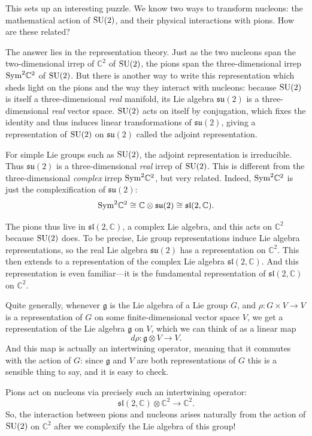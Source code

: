 \documentclass{article}
\newcommand{\maps}{\colon}    %
\newcommand{\C}{{\mathbb C}}  %
\newcommand{\SU}{{\rm SU}}    %
\renewcommand{\sl}{\mathfrak{sl}} %
\newcommand{\su}{{\mathfrak{su}}}  %
\newcommand{\Sym}{{\rm Sym}} %
\newcommand{\iso}{\cong} %
\begin{document}
This sets up an interesting puzzle.   We know two ways to transform 
nucleons: the mathematical action of $\SU(2)$, and their physical 
interactions with pions. How are these related?

The answer lies in the representation theory. Just as the two nucleons
span the two-dimensional irrep of $\C^2$ of $\SU(2)$, the pions 
span the three-dimensional irrep $\Sym^2 \C^2$ of $\SU(2)$. But there
is another way to write this representation which sheds light on the
pions and the way they interact with nucleons: because $\SU(2)$ is
itself a three-dimensional \emph{real} manifold, its Lie algebra
$\su(2)$ is a three-dimensional \emph{real}
vector space. $\SU(2)$ acts on itself by conjugation, which fixes the
identity and thus induces linear transformations of $\su(2)$, giving a
representation of $\SU(2)$ on $\su(2)$ called the adjoint
representation.

For simple Lie groups such as $\SU(2)$, the adjoint representation is
irreducible.  Thus $\su(2)$ is a three-dimensional \emph{real} irrep
of $\SU(2)$.  This is different from the three-dimensional \emph{complex} 
irrep $\Sym^2 \C^2$, but very related. Indeed, $\Sym^2 \C^2$ is just the
complexification of $\su(2)$:
\[ \Sym^2 \C^2 \iso \C \otimes \su(2) \iso \sl(2,\C) . \]

The pions thus live in $\sl(2,\C)$, a complex Lie algebra, and
this acts on $\C^2$ because $\SU(2)$ does. To be precise, Lie group
representations induce Lie algebra representations, so the real Lie algebra
$\su(2)$ has a representation on $\C^2$.  This then extends
to a representation of the complex Lie algebra $\sl(2,\C)$. 
And this representation is even familiar---it is the fundamental 
representation of $\sl(2,\C)$ on $\C^2$.

Quite generally, whenever $\mathfrak{g}$ is the Lie algebra of a 
Lie group $G$, and $\rho \maps G \times V \to V$ is a representation of
$G$ on some finite-dimensional vector space $V$, we get
a representation of the Lie algebra $\mathfrak{g}$ on $V$, which
we can think of as a linear map
\[ d\rho \maps \mathfrak{g} \otimes V \to V .\]
And this map is actually an intertwining operator,
meaning that it commutes with the action of $G$: since $\mathfrak{g}$ 
and $V$ are both representations of $G$ this is a sensible thing to 
say, and it is easy to check.

Pions act on nucleons via precisely such an intertwining operator:
\[ \sl(2, \C) \otimes \C^2 \to \C^2 . \]
So, the interaction between pions and nucleons arises naturally from 
the action of $\SU(2)$ on $\C^2$ after we complexify the Lie algebra of 
this group!  
\end{document}
